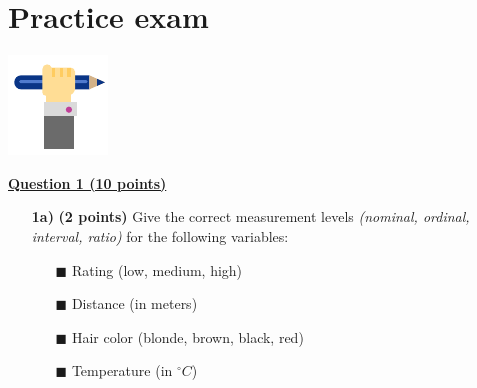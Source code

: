 
\begin{minipage}{0.8\textwidth}
\section{Practice exam}
\end{minipage}%
\hfill%
\begin{minipage}{0.1\textwidth}
\includegraphics[width=\linewidth]{Files/Images/pencilhand.pdf}
\end{minipage}
\vspace*{.1cm}

\underline{\textbf{Question 1 (10 points)}} \\

\begin{itemize}

\item[\textbf{1a)}] \textbf{(2 points)} Give the correct measurement levels \textit{(nominal, ordinal, interval, ratio)} for the following variables: 
\begin{itemize}
\item[$\blacksquare$] Rating (low, medium, high)
\item[$\blacksquare$] Distance (in meters)
\item[$\blacksquare$] Hair color (blonde, brown, black, red)
\item[$\blacksquare$] Temperature (in $^{\circ} C$) 
\end{itemize}
\end{itemize}

